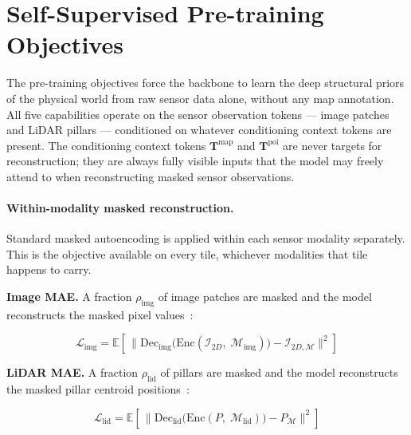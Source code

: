 \documentclass{book}
\begin{document}
\section{Self-Supervised Pre-training Objectives}
\label{sec:pretraining_objectives}

The pre-training objectives force the backbone to learn the deep
structural priors of the physical world from raw sensor data alone,
without any map annotation.  All five capabilities operate on the
sensor observation tokens --- image patches and LiDAR pillars ---
conditioned on whatever conditioning context tokens are present.
The conditioning context tokens $\mathbf{T}^{\text{map}}$ and
$\mathbf{T}^{\text{poi}}$ are never targets for reconstruction;
they are always fully visible inputs that the model may freely
attend to when reconstructing masked sensor observations.

\paragraph{Within-modality masked reconstruction.}

Standard masked autoencoding is applied within each sensor
modality separately.  This is the objective available on every
tile, whichever modalities that tile happens to carry.

\textbf{Image MAE.}  A fraction $\rho_{\text{img}}$ of image
patches are masked and the model reconstructs the masked pixel
values~\cite{he2022masked}:

\begin{equation}
  \mathcal{L}_{\text{img}} =
    \mathbb{E}\!\left[\,\bigl\|
      \mathrm{Dec}_{\text{img}}
        \bigl(\mathrm{Enc}(\mathcal{I}_{2D},\;
        \mathcal{M}_{\text{img}})\bigr)
      - \mathcal{I}_{2D,\mathcal{M}}
    \bigr\|^2\right]
  \label{eq:mae_img}
\end{equation}

\textbf{LiDAR MAE.}  A fraction $\rho_{\text{lid}}$ of pillars
are masked and the model reconstructs the masked pillar centroid
positions~\cite{min2022mae3d,pang2022masked}:

\begin{equation}
  \mathcal{L}_{\text{lid}} =
    \mathbb{E}\!\left[\,\bigl\|
      \mathrm{Dec}_{\text{lid}}
        \bigl(\mathrm{Enc}(P,\;
        \mathcal{M}_{\text{lid}})\bigr)
      - P_{\mathcal{M}}
    \bigr\|^2\right]
  \label{eq:mae_lid}
\end{equation}
\end{document}
